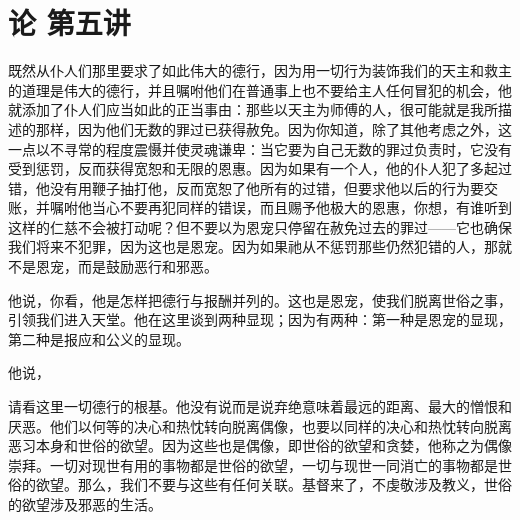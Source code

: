 

\section{论  第五讲}

\par

\par

既然从仆人们那里要求了如此伟大的德行，因为用一切行为装饰我们的天主和救主的道理是伟大的德行，并且嘱咐他们在普通事上也不要给主人任何冒犯的机会，他就添加了仆人们应当如此的正当事由：那些以天主为师傅的人，很可能就是我所描述的那样，因为他们无数的罪过已获得赦免。因为你知道，除了其他考虑之外，这一点以不寻常的程度震慑并使灵魂谦卑：当它要为自己无数的罪过负责时，它没有受到惩罚，反而获得宽恕和无限的恩惠。因为如果有一个人，他的仆人犯了多起过错，他没有用鞭子抽打他，反而宽恕了他所有的过错，但要求他以后的行为要交账，并嘱咐他当心不要再犯同样的错误，而且赐予他极大的恩惠，你想，有谁听到这样的仁慈不会被打动呢？但不要以为恩宠只停留在赦免过去的罪过——它也确保我们将来不犯罪，因为这也是恩宠。因为如果祂从不惩罚那些仍然犯错的人，那就不是恩宠，而是鼓励恶行和邪恶。\par

他说，你看，他是怎样把德行与报酬并列的。这也是恩宠，使我们脱离世俗之事，引领我们进入天堂。他在这里谈到两种显现；因为有两种：第一种是恩宠的显现，第二种是报应和公义的显现。\par

他说，\par

请看这里一切德行的根基。他没有说而是说弃绝意味着最远的距离、最大的憎恨和厌恶。他们以何等的决心和热忱转向脱离偶像，也要以同样的决心和热忱转向脱离恶习本身和世俗的欲望。因为这些也是偶像，即世俗的欲望和贪婪，他称之为偶像崇拜。一切对现世有用的事物都是世俗的欲望，一切与现世一同消亡的事物都是世俗的欲望。那么，我们不要与这些有任何关联。基督来了，不虔敬涉及教义，世俗的欲望涉及邪恶的生活。\par

